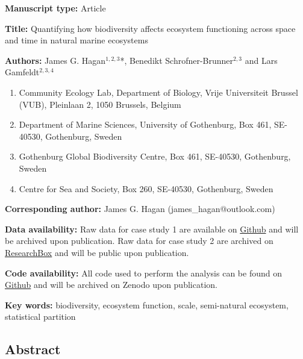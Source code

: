 \documentclass[
  letterpaper,
  DIV=11,
  numbers=noendperiod]{scrartcl}
\author{}
\date{}
\providecommand{\tightlist}{%
  \setlength{\itemsep}{0pt}\setlength{\parskip}{0pt}}\usepackage{longtable,booktabs,array}
\begin{document}
\textbf{Manuscript type:} Article

\textbf{Title:} Quantifying how biodiversity affects ecosystem
functioning across space and time in natural marine ecosystems

\textbf{Authors:} James G. Hagan\(^{1, 2, 3}\)*, Benedikt
Schrofner-Brunner\(^{2, 3}\) and Lars Gamfeldt\(^{2, 3, 4}\)

\begin{enumerate}
\def\labelenumi{\arabic{enumi}.}
\tightlist
\item
  Community Ecology Lab, Department of Biology, Vrije Universiteit
  Brussel (VUB), Pleinlaan 2, 1050 Brussels, Belgium\\
\item
  Department of Marine Sciences, University of Gothenburg, Box 461,
  SE-40530, Gothenburg, Sweden\\
\item
  Gothenburg Global Biodiversity Centre, Box 461, SE-40530, Gothenburg,
  Sweden\\
\item
  Centre for Sea and Society, Box 260, SE-40530, Gothenburg, Sweden
\end{enumerate}

\textbf{Corresponding author:} James G. Hagan (james\_hagan@outlook.com)

\textbf{Data availability:} Raw data for case study 1 are available on
\href{https://github.com/haganjam/BEF_quant_scale}{Github} and will be
archived upon publication. Raw data for case study 2 are archived on
\href{https://researchbox.org/843&PEER_REVIEW_passcode=GLGJFF}{ResearchBox}
and will be public upon publication.

\textbf{Code availability:} All code used to perform the analysis can be
found on \href{https://github.com/haganjam/BEF_quant_scale}{Github} and
will be archived on Zenodo upon publication.

\textbf{Key words:} biodiversity, ecosystem function, scale,
semi-natural ecosystem, statistical partition

\subsection{Abstract}\label{abstract}
\end{document}
